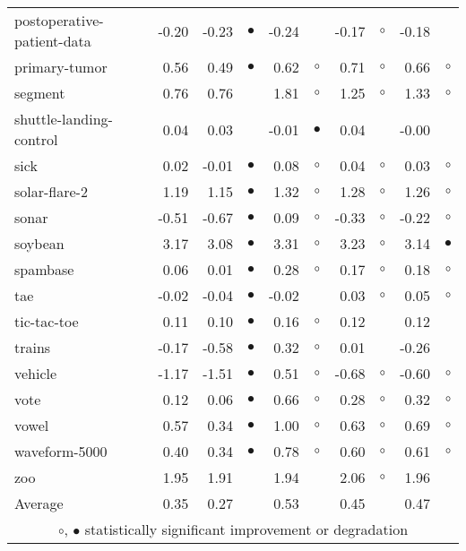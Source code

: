 \begin{table}[thb]
{\begin{tabular}{lrr@{\hspace{0.1cm}}cr@{\hspace{0.1cm}}cr@{\hspace{0.1cm}}cr@{\hspace{0.1cm}}c}
postoperative-patient-data & -0.20 & -0.23 & $\bullet$ & -0.24 &           & -0.17 &   $\circ$ & -0.18 &          \\
primary-tumor &  0.56 &  0.49 & $\bullet$ &  0.62 &   $\circ$ &  0.71 &   $\circ$ &  0.66 &   $\circ$\\
segment &  0.76 &  0.76 &           &  1.81 &   $\circ$ &  1.25 &   $\circ$ &  1.33 &   $\circ$\\
shuttle-landing-control &  0.04 &  0.03 &           & -0.01 & $\bullet$ &  0.04 &           & -0.00 &          \\
sick &  0.02 & -0.01 & $\bullet$ &  0.08 &   $\circ$ &  0.04 &   $\circ$ &  0.03 &   $\circ$\\
solar-flare-2 &  1.19 &  1.15 & $\bullet$ &  1.32 &   $\circ$ &  1.28 &   $\circ$ &  1.26 &   $\circ$\\
sonar & -0.51 & -0.67 & $\bullet$ &  0.09 &   $\circ$ & -0.33 &   $\circ$ & -0.22 &   $\circ$\\
soybean &  3.17 &  3.08 & $\bullet$ &  3.31 &   $\circ$ &  3.23 &   $\circ$ &  3.14 & $\bullet$\\
spambase &  0.06 &  0.01 & $\bullet$ &  0.28 &   $\circ$ &  0.17 &   $\circ$ &  0.18 &   $\circ$\\
tae & -0.02 & -0.04 & $\bullet$ & -0.02 &           &  0.03 &   $\circ$ &  0.05 &   $\circ$\\
tic-tac-toe &  0.11 &  0.10 & $\bullet$ &  0.16 &   $\circ$ &  0.12 &           &  0.12 &          \\
trains & -0.17 & -0.58 & $\bullet$ &  0.32 &   $\circ$ &  0.01 &           & -0.26 &          \\
vehicle & -1.17 & -1.51 & $\bullet$ &  0.51 &   $\circ$ & -0.68 &   $\circ$ & -0.60 &   $\circ$\\
vote &  0.12 &  0.06 & $\bullet$ &  0.66 &   $\circ$ &  0.28 &   $\circ$ &  0.32 &   $\circ$\\
vowel &  0.57 &  0.34 & $\bullet$ &  1.00 &   $\circ$ &  0.63 &   $\circ$ &  0.69 &   $\circ$\\
waveform-5000 &  0.40 &  0.34 & $\bullet$ &  0.78 &   $\circ$ &  0.60 &   $\circ$ &  0.61 &   $\circ$\\
zoo &  1.95 &  1.91 &           &  1.94 &           &  2.06 &   $\circ$ &  1.96 &          \\
\hline
Average &  0.35 &  0.27 &           &  0.53 &           &  0.45 &           &  0.47 &          \\
\hline
\multicolumn{10}{c}{$\circ$, $\bullet$ statistically significant improvement or degradation}\\
\end{tabular} \footnotesize \par}
\end{table}